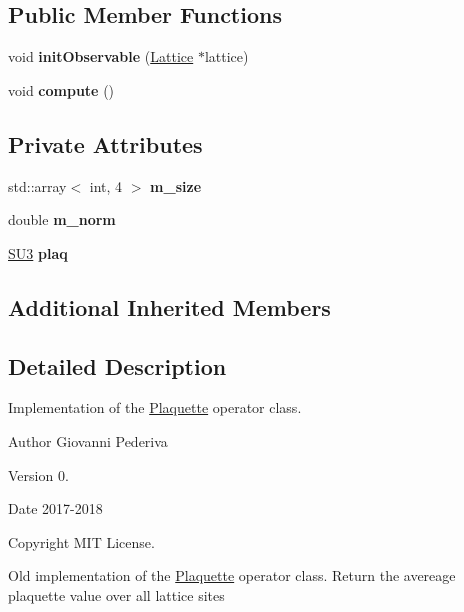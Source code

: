 \subsection*{Public Member Functions}
\begin{DoxyCompactItemize}
\item 
void {\bfseries init\+Observable} (\hyperlink{classLattice}{Lattice} $\ast$lattice)\hypertarget{classPlaquette_a736815cd93211ae6762d26f3694a88d5}{}\label{classPlaquette_a736815cd93211ae6762d26f3694a88d5}

\item 
void {\bfseries compute} ()\hypertarget{classPlaquette_a4f5cd3222dc5ecec563ff873507493ea}{}\label{classPlaquette_a4f5cd3222dc5ecec563ff873507493ea}

\end{DoxyCompactItemize}
\subsection*{Private Attributes}
\begin{DoxyCompactItemize}
\item 
std\+::array$<$ int, 4 $>$ {\bfseries m\+\_\+size}\hypertarget{classPlaquette_aef320da834a652eef5dc9fdaf9feb898}{}\label{classPlaquette_aef320da834a652eef5dc9fdaf9feb898}

\item 
double {\bfseries m\+\_\+norm}\hypertarget{classPlaquette_a01a530c15a05f0d0c0db0ee96df7f943}{}\label{classPlaquette_a01a530c15a05f0d0c0db0ee96df7f943}

\item 
\hyperlink{structSU3}{S\+U3} {\bfseries plaq}\hypertarget{classPlaquette_ada0642da7642a9d271681985b93a4070}{}\label{classPlaquette_ada0642da7642a9d271681985b93a4070}

\end{DoxyCompactItemize}
\subsection*{Additional Inherited Members}


\subsection{Detailed Description}
Implementation of the \hyperlink{classPlaquette}{Plaquette} operator class. 

\begin{DoxyAuthor}{Author}
Giovanni Pederiva 
\end{DoxyAuthor}
\begin{DoxyVersion}{Version}
0. 
\end{DoxyVersion}
\begin{DoxyDate}{Date}
2017-\/2018 
\end{DoxyDate}
\begin{DoxyCopyright}{Copyright}
M\+IT License.
\end{DoxyCopyright}
Old implementation of the \hyperlink{classPlaquette}{Plaquette} operator class. Return the avereage plaquette value over all lattice sites 

